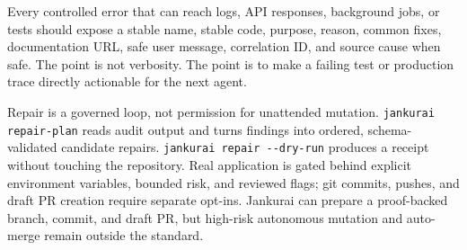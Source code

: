 Every controlled error that can reach logs, API responses, background jobs, or tests should expose a stable name, stable code, purpose, reason, common fixes, documentation URL, safe user message, correlation ID, and source cause when safe. The point is not verbosity. The point is to make a failing test or production trace directly actionable for the next agent.

Repair is a governed loop, not permission for unattended mutation. \texttt{jankurai repair-plan} reads audit output and turns findings into ordered, schema-validated candidate repairs. \verb|jankurai repair --dry-run| produces a receipt without touching the repository. Real application is gated behind explicit environment variables, bounded risk, and reviewed flags; git commits, pushes, and draft PR creation require separate opt-ins. Jankurai can prepare a proof-backed branch, commit, and draft PR, but high-risk autonomous mutation and auto-merge remain outside the standard.
